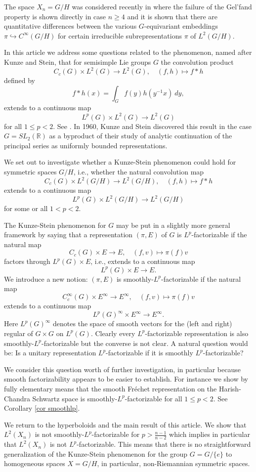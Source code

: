 \documentclass[12pt,letterpaper,titlepage,reqno]{amsart}
\theoremstyle{plain}
\theoremstyle{definition}
\numberwithin{equation}{section}
\newcommand{\R}{\mathbb{R}}
\begin{document}
The space $X_n=G/H$ was considered recently in \cite{KKS} where the failure of the Gel'fand property is shown directly in case $n\geq 4$ and it is shown that there are quantitative differences between the various $G$-equivariant embeddings $\pi\hookrightarrow C^{\infty}(G/H)$ for certain irreducible subrepresentations $\pi$ of $L^{2}(G/H)$.

In this article we address some questions related to the phenomenon, named after Kunze and Stein, that for semisimple Lie groups $G$ the convolution product
$$
C_{c}(G)\times L^{2}(G)\to L^{2}(G),\quad (f,h)\mapsto f*h
$$
defined by
$$
f\ast h(x)=\int_{G}f(y)h(y^{-1}x)~dy,
$$
extends to a continuous map
$$
L^p(G)\times L^2(G)\to L^2(G)
$$
for all $1\leq p<2$. See \cite{C}.
In 1960, Kunze and Stein \cite{KS} discovered this result in the case $G=SL_2(\R)$ as a byproduct of their study of  analytic continuation of  the principal series  as uniformly bounded representations.

We set out to investigate whether a Kunze-Stein phenomenon could hold for symmetric spaces $G/H$, i.e., whether the natural convolution map
$$
C_{c}(G)\times L^{2}(G/H)\to L^{2}(G/H),\quad (f,h)\mapsto f*h
$$
extends to a continuous map
$$
L^p(G)\times L^2(G/H)\to L^2(G/H)
$$
for some or all $1< p<2$.
\par The Kunze-Stein phenomenon for $G$  may be put in a slightly more general framework by saying that a representation $(\pi,E)$ of $G$ is $L^{p}$-factorizable  if the natural map
$$
C_{c}(G)\times E\to E,\quad (f,v)\mapsto \pi(f)v
$$
factors through $L^{p}(G)\times E$, i.e.,  extends to a continuous map
$$
L^p(G)\times E\to E.
$$
We introduce a new notion:  $(\pi,E)$ is smoothly-$L^{p}$-factorizable if the natural map
$$
C_{c}^{\infty}(G)\times E^{\infty}\to E^{\infty},\quad (f,v)\mapsto \pi(f)v
$$
extends to a continuous map
$$
L^p(G)^{\infty}\times E^{\infty}\to E^{\infty}.
$$
Here $L^p(G)^{\infty}$ denotes the space of smooth vectors for the (left and right) regular of $G\times G$ on $L^p(G)$.
Clearly every $L^{p}$-factorizable representation is also smoothly-$L^{p}$-factorizable but the converse is not clear. A natural question would be:
\medbreak {} Is a unitary representation $L^p$-factorizable if it is smoothly $L^p$-factorizable?
 \medbreak

We consider this question worth of further investigation, in particular because smooth factorizability appears to be easier to establish. For instance we show by fully elementary means that the smooth Fr\'echet representation on the Harish-Chandra Schwartz space is smoothly-$L^p$-factorizable for all
$1\leq p<2$. See Corollary \ref{cor smoothlp}.
\par We return to the hyperboloids and the main result of this article. We show that
$L^2(X_n)$ is not smoothly-$L^p$-factorizable for
$p>\frac{n-1}{n-2}$ which implies in particular that $L^2(X_n)$ is not $L^p$-factorizable.
This means that there is no straightforward generalization of the Kunze-Stein phenomenon for the group $G=G/\{e\}$ to homogeneous spaces $X=G/H$, in particular, non-Riemannian symmetric spaces.
\end{document}
